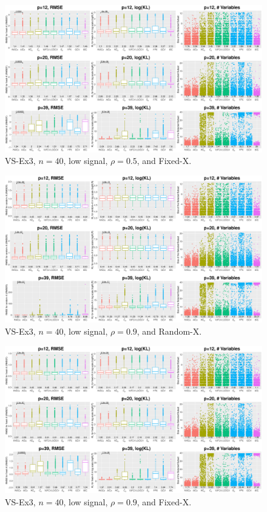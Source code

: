 \begin{figure}[!ht]
\centering
\includegraphics[width=\textwidth]{figures/supplement/fixedx_VS-Ex3_n40_lsnr_rho05.eps}
\caption{VS-Ex3, $n=40$, low signal, $\rho=0.5$, and Fixed-X.}
\end{figure}
\clearpage
\begin{figure}[!ht]
\centering
\includegraphics[width=\textwidth]{figures/supplement/randomx_VS-Ex3_n40_lsnr_rho09.eps}
\caption{VS-Ex3, $n=40$, low signal, $\rho=0.9$, and Random-X.}
\end{figure}
\begin{figure}[!ht]
\centering
\includegraphics[width=\textwidth]{figures/supplement/fixedx_VS-Ex3_n40_lsnr_rho09.eps}
\caption{VS-Ex3, $n=40$, low signal, $\rho=0.9$, and Fixed-X.}
\end{figure}

